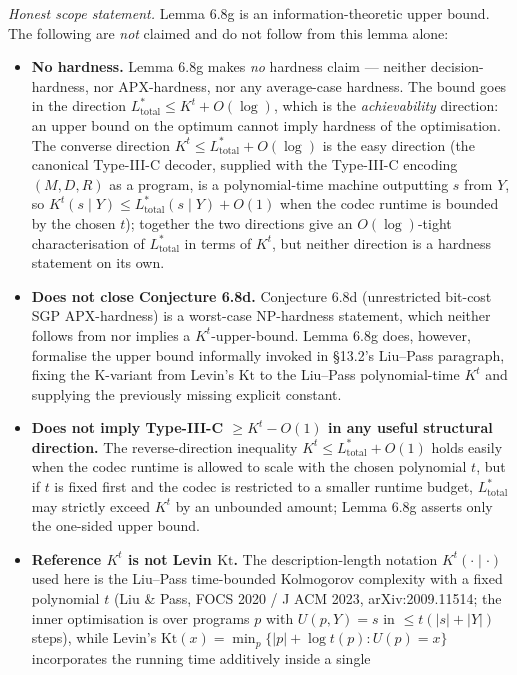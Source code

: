 \documentclass[
]{article}
\begin{document}
\emph{Honest scope statement.} Lemma 6.8g is an information-theoretic
upper bound. The following are \emph{not} claimed and do not follow
from this lemma alone:
\begin{itemize}
\item \textbf{No hardness.} Lemma 6.8g makes \emph{no} hardness
claim --- neither decision-hardness, nor APX-hardness, nor any
average-case hardness. The bound goes in the direction
$L^*_{\mathrm{total}} \leq K^t + O(\log)$, which is the
\emph{achievability} direction: an upper bound on the optimum cannot
imply hardness of the optimisation. The converse direction
$K^t \leq L^*_{\mathrm{total}} + O(\log)$ is the easy direction
(the canonical Type-III-C decoder, supplied with the Type-III-C
encoding $(M,D,R)$ as a program, is a polynomial-time machine
outputting $s$ from $Y$, so $K^t(s \mid Y) \leq L^*_{\mathrm{total}}(s \mid Y) +
O(1)$ when the codec runtime is bounded by the chosen $t$); together
the two directions give an $O(\log)$-tight characterisation of
$L^*_{\mathrm{total}}$ in terms of $K^t$, but neither direction is a
hardness statement on its own.
\item \textbf{Does not close Conjecture 6.8d.} Conjecture 6.8d
(unrestricted bit-cost SGP APX-hardness) is a worst-case
NP-hardness statement, which neither follows from nor implies a
$K^t$-upper-bound. Lemma 6.8g does, however, formalise the upper
bound informally invoked in §13.2's Liu--Pass paragraph, fixing the
K-variant from Levin's $\mathrm{Kt}$ to the Liu--Pass polynomial-time
$K^t$ and supplying the previously missing explicit constant.
\item \textbf{Does not imply Type-III-C $\geq K^t - O(1)$ in any
useful structural direction.} The reverse-direction inequality
$K^t \leq L^*_{\mathrm{total}} + O(1)$ holds easily when the codec
runtime is allowed to scale with the chosen polynomial $t$, but if
$t$ is fixed first and the codec is restricted to a smaller runtime
budget, $L^*_{\mathrm{total}}$ may strictly exceed $K^t$ by an
unbounded amount; Lemma 6.8g asserts only the one-sided upper bound.
\item \textbf{Reference $K^t$ is not Levin $\mathrm{Kt}$.} The
description-length notation $K^t(\cdot \mid \cdot)$ used here is the
Liu--Pass time-bounded Kolmogorov complexity with a fixed polynomial
$t$ (Liu \& Pass, FOCS 2020 / J ACM 2023, arXiv:2009.11514; the
inner optimisation is over programs $p$ with $U(p, Y) = s$ in
$\leq t(|s|+|Y|)$ steps), while
Levin's $\mathrm{Kt}(x) = \min_p \{|p| + \log t(p) : U(p) = x\}$
incorporates the running time additively inside a single

\end{itemize}
\end{document}
